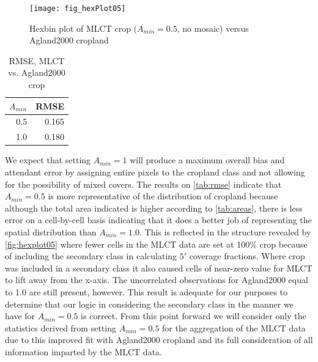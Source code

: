 \begin{figure}[ht]
  \centering



\texttt{[image: fig\_hexPlot05]}
  \caption{Hexbin plot of MLCT crop ($A_{min}=0.5$, no mosaic) versus Agland2000 cropland}
  \label{fig:hexplot05} 
\end{figure} 

\begin{table}[ht]
\begin{center}
\begin{tabular}{rr}
  \hline
$A_{min}$ & RMSE \\ 
  \hline
0.5 & 0.165 \\ 
  1.0 & 0.180 \\ 
   \hline
\end{tabular}
\caption{RMSE, MLCT vs. Agland2000 crop}
\label{tab:rmse}
\end{center}
\end{table}

We expect that setting $A_{min}=1$ will produce a maximum overall bias
and attendant error by assigning entire pixels to the cropland class
and not allowing for the possibility of mixed covers.  The results on
\autoref{tab:rmse} indicate that $A_{min}=0.5$ is more representative
of the distribution of cropland because although the total area
indicated is higher according to \autoref{tab:areas}, there is less
error on a cell-by-cell basis indicating that it does a better job of
representing the spatial distribution than $A_{min}=1.0$.  This is
reflected in the structure revealed by \autoref{fig:hexplot05} where
fewer cells in the MLCT data are set at 100\% crop because of
including the secondary class in calculating $5'$ coverage fractions.
Where crop was included in a secondary class it also caused cells of
near-zero value for MLCT to lift away from the x-axis.  The
uncorrelated observations for Agland2000 equal to 1.0 are still
present, however.  This result is adequate for our purposes to
determine that our logic in considering the secondary class in the
manner we have for $A_{min}=0.5$ is correct.  From this point forward
we will consider only the statistics derived from setting
$A_{min}=0.5$ for the aggregation of the MLCT data due to this
improved fit with Agland2000 cropland and its full consideration of
all information imparted by the MLCT data.


